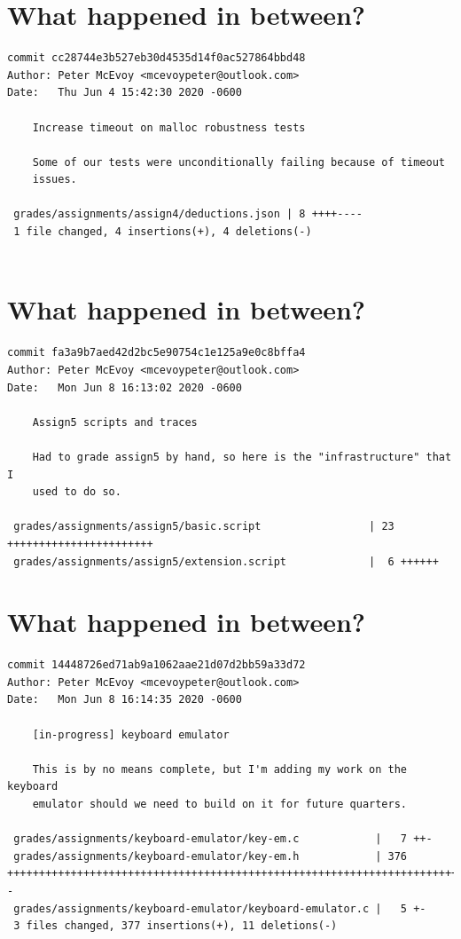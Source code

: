 \documentclass{article}
\begin{document}
\newpage

\section*{What happened in between?}
\vspace{2ex}
\begin{verbatim}
commit cc28744e3b527eb30d4535d14f0ac527864bbd48
Author: Peter McEvoy <mcevoypeter@outlook.com>
Date:   Thu Jun 4 15:42:30 2020 -0600

    Increase timeout on malloc robustness tests
    
    Some of our tests were unconditionally failing because of timeout
    issues.

 grades/assignments/assign4/deductions.json | 8 ++++----
 1 file changed, 4 insertions(+), 4 deletions(-)


\end{verbatim}

\newpage

\section*{What happened in between?}
\vspace{2ex}
\begin{verbatim}
commit fa3a9b7aed42d2bc5e90754c1e125a9e0c8bffa4
Author: Peter McEvoy <mcevoypeter@outlook.com>
Date:   Mon Jun 8 16:13:02 2020 -0600

    Assign5 scripts and traces
    
    Had to grade assign5 by hand, so here is the "infrastructure" that I
    used to do so.

 grades/assignments/assign5/basic.script                 | 23 +++++++++++++++++++++++
 grades/assignments/assign5/extension.script             |  6 ++++++

\end{verbatim}

\newpage

\section*{What happened in between?}
\vspace{2ex}
\begin{verbatim}
commit 14448726ed71ab9a1062aae21d07d2bb59a33d72
Author: Peter McEvoy <mcevoypeter@outlook.com>
Date:   Mon Jun 8 16:14:35 2020 -0600

    [in-progress] keyboard emulator
    
    This is by no means complete, but I'm adding my work on the keyboard
    emulator should we need to build on it for future quarters.

 grades/assignments/keyboard-emulator/key-em.c            |   7 ++-
 grades/assignments/keyboard-emulator/key-em.h            | 376 +++++++++++++++++++++++++++++++++++++++++++++++++++++++++++++++++++++++++++++++++++++++++++++++++++++++++++++++++++++++++++++++++++++++++++++++++--
 grades/assignments/keyboard-emulator/keyboard-emulator.c |   5 +-
 3 files changed, 377 insertions(+), 11 deletions(-)
\end{verbatim}
\end{document}
